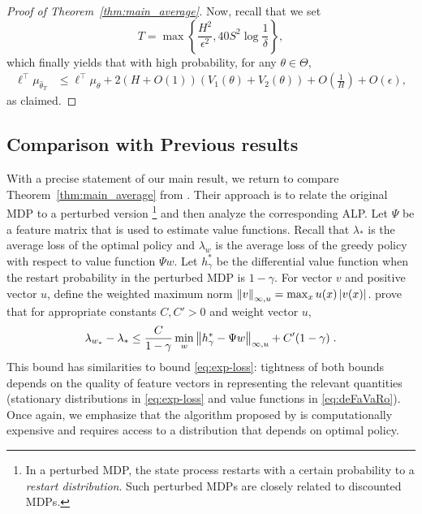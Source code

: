 \documentclass[11pt]{article}
\begin{document}
\begin{proof}[Proof of Theorem~\ref{thm:main_average}]
Now, recall that we set
\begin{equation*}
 T = \max\left\{\frac{H^2}{\epsilon^2}, 40S^2\log\frac{1}{\delta}\right\},
\end{equation*}
which finally yields that with high probability, for any $\theta\in\Theta$,
\begin{align*}
  \ell^\top \mu_{\widehat\theta_T}
    &\leq
      \ell^\top\mu_\theta      
       +2\left(H+ O(1)\right)\left(V_1(\theta) + V_2(\theta)\right)
      + O\left(\frac{1}{H}\right)
      +O\left(\epsilon\right),      
\end{align*}
as claimed.
\end{proof}


\subsection{Comparison with Previous results}
With a precise statement of our main result, we return to compare Theorem~\ref{thm:main_average} from \citet{DeFarias-VanRoy-2006}. Their approach is to relate the original MDP to a perturbed version \footnote{In a perturbed MDP, the state process restarts with a certain probability to a \textit{restart distribution}. Such perturbed MDPs are closely related to discounted MDPs.} and then analyze the corresponding ALP.  Let $\Psi$ be a feature matrix that is used to estimate value functions. Recall that $\lambda_*$ is the average loss of the optimal policy and $\lambda_{w}$ is the average loss of the greedy policy with respect to value function $\Psi w$. Let $h_\gamma^*$ be the differential value function when the restart probability in the perturbed MDP is $1-\gamma$. For vector $v$ and positive vector $u$, define the weighted maximum norm $\left\Vert v\right\Vert_{\infty, u} = \max_x u(x) \left\vert v(x)\right\vert$. \citet{DeFarias-VanRoy-2006} prove that for appropriate constants $C,C'>0$ and weight vector $u$,
\begin{equation}
\label{eq:deFaVaRo}
\lambda_{w_*} - \lambda_* \le \frac{C}{1-\gamma} \min_{w} \left\Vert h_\gamma^* - \Psi w\right\Vert_{\infty, u} + C' (1-\gamma) \; .
\end{equation}
This bound has similarities to bound \eqref{eq:exp-loss}: tightness of both bounds depends on the quality of feature vectors in representing the relevant quantities (stationary distributions in \eqref{eq:exp-loss} and value functions in \eqref{eq:deFaVaRo}). Once again, we emphasize that the algorithm proposed by \citet{DeFarias-VanRoy-2006} is computationally expensive and requires access to a distribution that depends on optimal policy.
\end{document}

